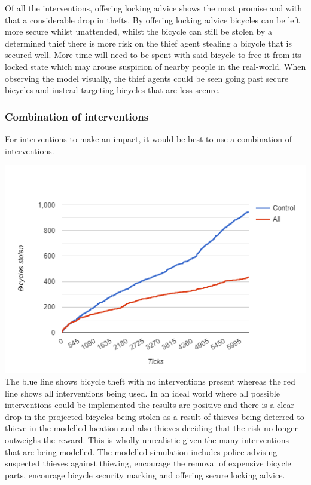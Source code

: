 \documentclass[11pt]{informatics-report}
\begin{document}
Of all the interventions, offering locking advice shows the most promise and with that a considerable drop in thefts. By offering locking advice bicycles can be left more secure whilst unattended, whilst the bicycle can still be stolen by a determined thief there is more risk on the thief agent stealing a bicycle that is secured well.  More time will need to be spent with said bicycle to free it from its locked state which may arouse suspicion of nearby people in the real-world. When observing the model visually, the thief agents could be seen going past secure bicycles and instead targeting bicycles that are less secure.
\subsubsection{Combination of interventions}
For interventions to make an impact, it would be best to use a combination of interventions. 

\includegraphics[width = 1\textwidth]{inteventionvsno.png}
The blue line shows bicycle theft with no interventions present whereas the red line shows all interventions being used. In an ideal world where all possible interventions could be implemented the results are positive and there is a clear drop in the projected bicycles being stolen as a result of thieves being deterred to thieve in the modelled location and also thieves deciding that the risk no longer outweighs the reward. This is wholly unrealistic given the many interventions that are being modelled. The modelled simulation includes police advising suspected thieves against thieving, encourage the removal of expensive bicycle parts, encourage bicycle security marking and offering secure locking advice.
\end{document}
